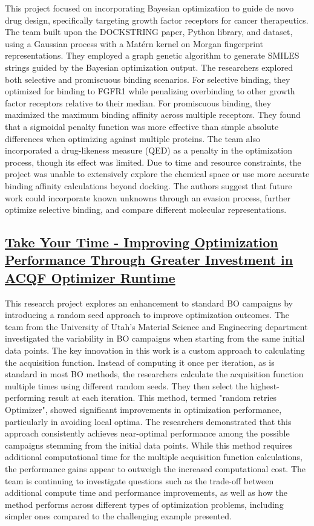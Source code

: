 This project focused on incorporating Bayesian optimization to guide de novo drug design, specifically targeting growth factor receptors for cancer therapeutics. The team built upon the DOCKSTRING paper, Python library, and dataset\cite{garcia_dockstring_2022}, using a Gaussian process with a Matérn kernel on Morgan fingerprint representations. They employed a graph genetic algorithm to generate SMILES strings guided by the Bayesian optimization output. The researchers explored both selective and promiscuous binding scenarios. For selective binding, they optimized for binding to FGFR1 while penalizing overbinding to other growth factor receptors relative to their median. For promiscuous binding, they maximized the maximum binding affinity across multiple receptors. They found that a sigmoidal penalty function was more effective than simple absolute differences when optimizing against multiple proteins. The team also incorporated a drug-likeness measure (QED)\cite{bickerton_quantifying_2012} as a penalty in the optimization process, though its effect was limited. Due to time and resource constraints, the project was unable to extensively explore the chemical space or use more accurate binding affinity calculations beyond docking. The authors suggest that future work could incorporate known unknowns through an evasion process, further optimize selective binding, and compare different molecular representations.
 \subsection*{\href{https://www.youtube.com/watch?v=WkGfShRSYW4}{Take Your Time - Improving Optimization Performance Through Greater Investment in ACQF Optimizer Runtime}}

This research project explores an enhancement to standard BO campaigns by introducing a random seed approach to improve optimization outcomes. The team from the University of Utah's Material Science and Engineering department investigated the variability in BO campaigns when starting from the same initial data points. The key innovation in this work is a custom approach to calculating the acquisition function. Instead of computing it once per iteration, as is standard in most BO methods\cite{shahriari2015taking, snoek2012practical}, the researchers calculate the acquisition function multiple times using different random seeds. They then select the highest-performing result at each iteration. This method, termed "random retries Optimizer", showed significant improvements in optimization performance, particularly in avoiding local optima. The researchers demonstrated that this approach consistently achieves near-optimal performance among the possible campaigns stemming from the initial data points. While this method requires additional computational time for the multiple acquisition function calculations, the performance gains appear to outweigh the increased computational cost. The team is continuing to investigate questions such as the trade-off between additional compute time and performance improvements, as well as how the method performs across different types of optimization problems, including simpler ones compared to the challenging example presented.
